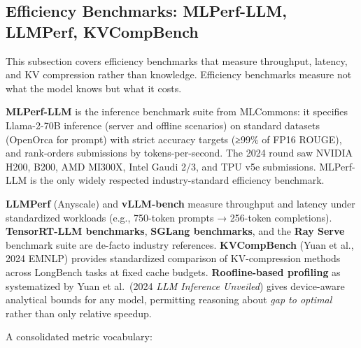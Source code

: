 \documentclass{article}
\begin{document}
\subsection{Efficiency Benchmarks: MLPerf-LLM, LLMPerf, KVCompBench}\label{efficiency-benchmarks-mlperf-llm-llmperf-kvcompbench}

This subsection covers efficiency benchmarks that measure throughput, latency, and KV compression rather than knowledge. Efficiency benchmarks measure not what the model knows but what it costs.

\textbf{MLPerf-LLM} is the inference benchmark suite from MLCommons: it specifies Llama-2-70B inference (server and offline scenarios) on standard datasets (OpenOrca for prompt) with strict accuracy targets (≥99\% of FP16 ROUGE), and rank-orders submissions by tokens-per-second. The 2024 round saw NVIDIA H200, B200, AMD MI300X, Intel Gaudi 2/3, and TPU v5e submissions. MLPerf-LLM is the only widely respected industry-standard efficiency benchmark.

\textbf{LLMPerf} (Anyscale) and \textbf{vLLM-bench} measure throughput and latency under standardized workloads (e.g., 750-token prompts → 256-token completions). \textbf{TensorRT-LLM benchmarks}, \textbf{SGLang benchmarks}, and the \textbf{Ray Serve} benchmark suite are de-facto industry references. \textbf{KVCompBench} (Yuan et al., 2024 EMNLP) provides standardized comparison of KV-compression methods across LongBench tasks at fixed cache budgets. \textbf{Roofline-based profiling} as systematized by Yuan et al.~(2024 \emph{LLM Inference Unveiled}) gives device-aware analytical bounds for any model, permitting reasoning about \emph{gap to optimal} rather than only relative speedup.

A consolidated metric vocabulary:
\end{document}
